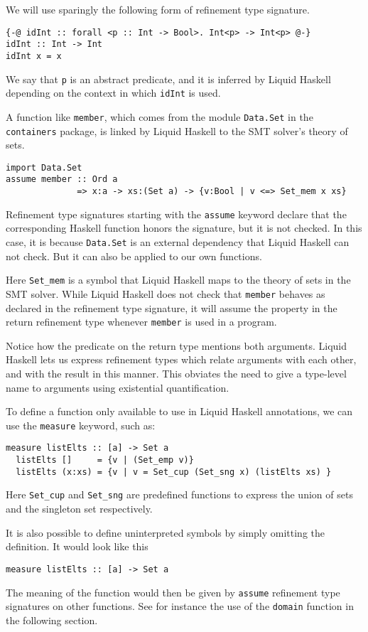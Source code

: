 \documentclass[sigconf]{acmart}
\newcommand{\tc}[1]{{\small\texttt{#1}}}
\begin{document}
We will use sparingly the following form of refinement type signature.
\begin{verbatim}
{-@ idInt :: forall <p :: Int -> Bool>. Int<p> -> Int<p> @-}
idInt :: Int -> Int
idInt x = x
\end{verbatim}
We say that \tc{p} is an abstract predicate, and it is inferred by Liquid Haskell
depending on the context in which \tc{idInt} is used.

A function like \tc{member}, which comes from the module \tc{Data.Set}
in the \tc{containers} package, is linked by Liquid Haskell to the
SMT solver's theory of sets.
\begin{verbatim}
import Data.Set
assume member :: Ord a
              => x:a -> xs:(Set a) -> {v:Bool | v <=> Set_mem x xs}
\end{verbatim}
Refinement type signatures starting with the \tc{assume} keyword declare that the
corresponding Haskell function honors the signature, but it is not
checked. In this case, it is because \tc{Data.Set} is an external dependency that
Liquid Haskell can not check. But it can also be applied to our own functions.

Here \tc{Set\_mem} is a symbol that Liquid Haskell maps to the theory
of sets in the SMT solver. While Liquid Haskell does not check that
\tc{member} behaves as declared in the refinement type signature,
it will assume the property in the return refinement type
whenever \tc{member} is used in a program.

Notice how the predicate on the return type mentions both arguments. Liquid
Haskell lets us express refinement types which relate arguments with each other,
and with the result in this manner. This obviates the need to
give a type-level name to arguments using existential quantification.

To define a function only available to use in Liquid Haskell annotations,
we can use the \tc{measure} keyword, such as:
\begin{verbatim}
measure listElts :: [a] -> Set a
  listElts []     = {v | (Set_emp v)}
  listElts (x:xs) = {v | v = Set_cup (Set_sng x) (listElts xs) }
\end{verbatim}
Here \tc{Set\_cup} and \tc{Set\_sng} are predefined functions to express the
union of sets and the singleton set respectively.

It is also possible to define uninterpreted symbols by simply omitting the
definition. It would look like this
\begin{verbatim}
measure listElts :: [a] -> Set a
\end{verbatim}
The meaning of the function would then be given by \tc{assume} refinement
type signatures on other functions. See for instance the use of the \tc{domain}
function in the following section.
\end{document}
